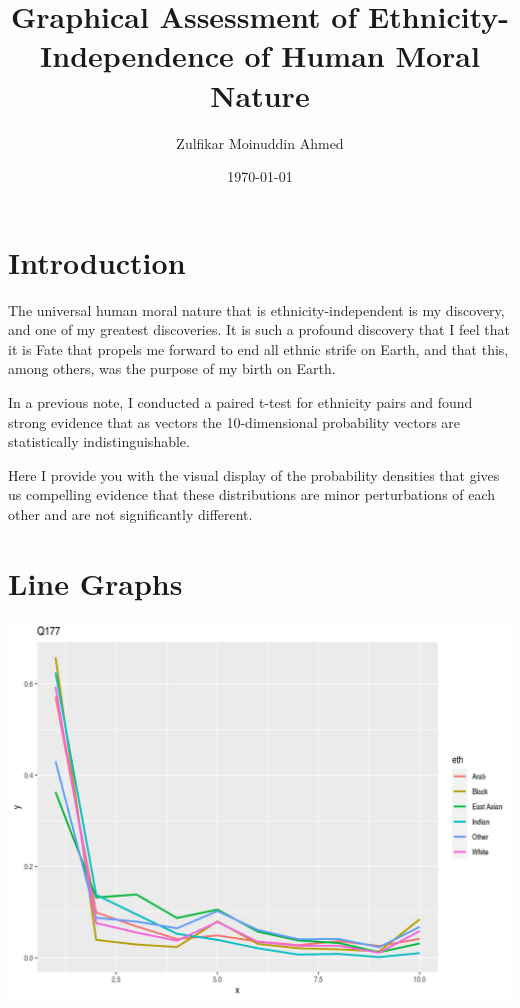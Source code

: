 \documentclass{amsart}
\title{Graphical Assessment of Ethnicity-Independence of Human Moral Nature}
\author{Zulfikar Moinuddin Ahmed}
\date{\today}
\begin{document}
\maketitle

\section{Introduction}

The universal human moral nature that is ethnicity-independent is my discovery, and one of my greatest discoveries.  It is such a profound discovery that I feel that it is Fate that propels me forward to end all ethnic strife on Earth, and that this, among others, was the purpose of my birth on Earth.  

In a previous note, I conducted a paired t-test for ethnicity pairs and found strong evidence that as vectors the 10-dimensional probability vectors are statistically indistinguishable.

Here I provide you with the visual display of the probability densities that gives us compelling evidence that these distributions are minor perturbations of each other and are not significantly different.


\section{Line Graphs}

\includegraphics[scale=0.7]{q177.jpeg}
\end{document}
